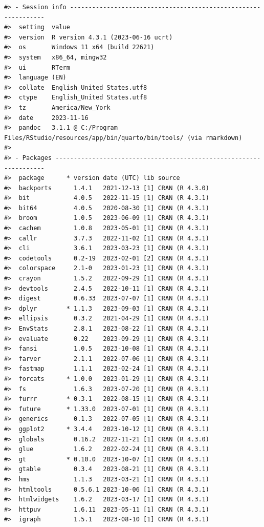 \documentclass[
  letterpaper,
  DIV=11,
  numbers=noendperiod]{scrreport}
\begin{document}
\begin{verbatim}
#> - Session info ---------------------------------------------------------------
#>  setting  value
#>  version  R version 4.3.1 (2023-06-16 ucrt)
#>  os       Windows 11 x64 (build 22621)
#>  system   x86_64, mingw32
#>  ui       RTerm
#>  language (EN)
#>  collate  English_United States.utf8
#>  ctype    English_United States.utf8
#>  tz       America/New_York
#>  date     2023-11-16
#>  pandoc   3.1.1 @ C:/Program Files/RStudio/resources/app/bin/quarto/bin/tools/ (via rmarkdown)
#> 
#> - Packages -------------------------------------------------------------------
#>  package      * version date (UTC) lib source
#>  backports      1.4.1   2021-12-13 [1] CRAN (R 4.3.0)
#>  bit            4.0.5   2022-11-15 [1] CRAN (R 4.3.1)
#>  bit64          4.0.5   2020-08-30 [1] CRAN (R 4.3.1)
#>  broom          1.0.5   2023-06-09 [1] CRAN (R 4.3.1)
#>  cachem         1.0.8   2023-05-01 [1] CRAN (R 4.3.1)
#>  callr          3.7.3   2022-11-02 [1] CRAN (R 4.3.1)
#>  cli            3.6.1   2023-03-23 [1] CRAN (R 4.3.1)
#>  codetools      0.2-19  2023-02-01 [2] CRAN (R 4.3.1)
#>  colorspace     2.1-0   2023-01-23 [1] CRAN (R 4.3.1)
#>  crayon         1.5.2   2022-09-29 [1] CRAN (R 4.3.1)
#>  devtools       2.4.5   2022-10-11 [1] CRAN (R 4.3.1)
#>  digest         0.6.33  2023-07-07 [1] CRAN (R 4.3.1)
#>  dplyr        * 1.1.3   2023-09-03 [1] CRAN (R 4.3.1)
#>  ellipsis       0.3.2   2021-04-29 [1] CRAN (R 4.3.1)
#>  EnvStats       2.8.1   2023-08-22 [1] CRAN (R 4.3.1)
#>  evaluate       0.22    2023-09-29 [1] CRAN (R 4.3.1)
#>  fansi          1.0.5   2023-10-08 [1] CRAN (R 4.3.1)
#>  farver         2.1.1   2022-07-06 [1] CRAN (R 4.3.1)
#>  fastmap        1.1.1   2023-02-24 [1] CRAN (R 4.3.1)
#>  forcats      * 1.0.0   2023-01-29 [1] CRAN (R 4.3.1)
#>  fs             1.6.3   2023-07-20 [1] CRAN (R 4.3.1)
#>  furrr        * 0.3.1   2022-08-15 [1] CRAN (R 4.3.1)
#>  future       * 1.33.0  2023-07-01 [1] CRAN (R 4.3.1)
#>  generics       0.1.3   2022-07-05 [1] CRAN (R 4.3.1)
#>  ggplot2      * 3.4.4   2023-10-12 [1] CRAN (R 4.3.1)
#>  globals        0.16.2  2022-11-21 [1] CRAN (R 4.3.0)
#>  glue           1.6.2   2022-02-24 [1] CRAN (R 4.3.1)
#>  gt           * 0.10.0  2023-10-07 [1] CRAN (R 4.3.1)
#>  gtable         0.3.4   2023-08-21 [1] CRAN (R 4.3.1)
#>  hms            1.1.3   2023-03-21 [1] CRAN (R 4.3.1)
#>  htmltools      0.5.6.1 2023-10-06 [1] CRAN (R 4.3.1)
#>  htmlwidgets    1.6.2   2023-03-17 [1] CRAN (R 4.3.1)
#>  httpuv         1.6.11  2023-05-11 [1] CRAN (R 4.3.1)
#>  igraph         1.5.1   2023-08-10 [1] CRAN (R 4.3.1)

\end{verbatim}
\end{document}
